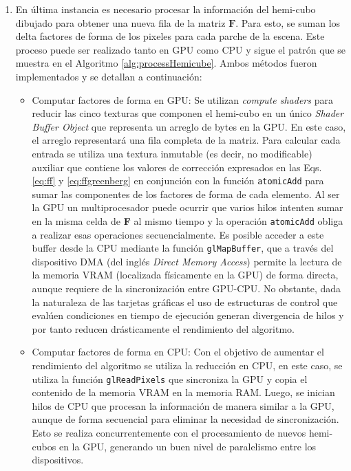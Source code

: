 \begin{enumerate}
	\item En última instancia es necesario procesar la información del hemi-cubo dibujado para obtener una nueva fila de la matriz $\mathbf{F}$. Para esto, se suman los delta factores de forma de los pixeles para cada parche de la escena. Este proceso puede ser realizado tanto en GPU como CPU y sigue el patrón que se muestra en el Algoritmo \ref{alg:processHemicube}. Ambos métodos fueron implementados y se detallan a continuación:
	\begin{itemize}
		\item Computar factores de forma en GPU: Se utilizan \textit{compute shaders} para reducir las cinco texturas que componen el hemi-cubo en un único \textit{Shader Buffer Object} que representa un arreglo de bytes en la GPU. En este caso, el arreglo representará una fila completa de la matriz. Para calcular cada entrada se utiliza una textura inmutable (es decir, no modificable) auxiliar que contiene los valores de corrección expresados en las Eqs. \eqref{eq:ff} y \eqref{eq:ffgreenberg} en conjunción con la función \verb|atomicAdd| para sumar las componentes de los factores de forma de cada elemento. Al ser la GPU un multiprocesador puede ocurrir que varios hilos intenten sumar en la misma celda de \textbf{F} al mismo tiempo y la operación \verb|atomicAdd| obliga a realizar esas operaciones secuencialmente.
		Es posible acceder a este buffer desde la CPU mediante la función \verb|glMapBuffer|, que a través del dispositivo DMA (del inglés \textit{Direct Memory Access}) permite la lectura de la memoria VRAM (localizada físicamente en la GPU) de forma directa, aunque requiere de la sincronización entre GPU-CPU.
		No obstante, dada la naturaleza de las tarjetas gráficas el uso de estructuras de control que evalúen condiciones en tiempo de ejecución generan divergencia de hilos y por tanto reducen drásticamente el rendimiento del algoritmo.
		\item Computar factores de forma en CPU: Con el objetivo de aumentar el rendimiento del algoritmo se utiliza la reducción en CPU, en este caso, se utiliza la función \verb|glReadPixels| que sincroniza la GPU y copia el contenido de la memoria VRAM en la memoria RAM. Luego, se inician hilos de CPU que procesan la información de manera similar a la GPU, aunque de forma secuencial para eliminar la necesidad de sincronización.  Esto se realiza concurrentemente con el procesamiento de nuevos hemi-cubos en la GPU, generando un buen nivel de paralelismo entre los dispositivos.
	\end{itemize}
 \end{enumerate}


